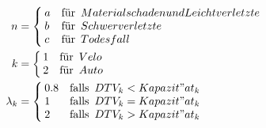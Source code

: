 \begin{align*}
      n &=
      \begin{cases}
        \begin{aligned}
          & a  \\
          & b \\
          & c
        \end{aligned} &
        \begin{aligned}
         & \text{für}\ \thinspace \\
         & \text{für}\ \thinspace \\
         & \text{für}\ \thinspace
        \end{aligned}
        \begin{aligned}
          & {Materialschaden und Leichtverletzte} \\
          & {Schwerverletzte} \\
          & {Todesfall}
        \end{aligned}
      \end{cases}  \\
      k &=
      \begin{cases}
        \begin{aligned}
          & 1 \\
          & 2
        \end{aligned} &
        \begin{aligned}
         & \text{für}\ \thinspace \\
         & \text{für}\ \thinspace
        \end{aligned}
        \begin{aligned}
          & Velo \\
          & Auto
        \end{aligned}
      \end{cases} \\
      \lambda_{k} &=
      \begin{cases}
        \begin{aligned}
          & 0.8  \\
          & 1 \\
          & 2
        \end{aligned} &
        \begin{aligned}
         & \text{falls}\ \thinspace \\
         & \text{falls}\ \thinspace \\
         & \text{falls}\ \thinspace
        \end{aligned}
        \begin{aligned}
          & DTV_{k} < Kapazit"at_{k} \\
          & DTV_{k} = Kapazit"at_{k} \\
          & DTV_{k} > Kapazit"at_{k}
        \end{aligned}
      \end{cases}
\end{align*}

